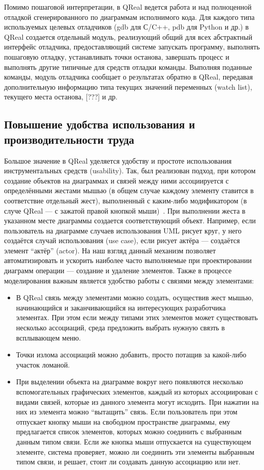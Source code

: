 \documentclass[a4paper]{article}
\begin{document}
Помимо пошаговой интерпретации, в QReal ведется работа и над полноценной отладкой сгенерированного по диаграммам исполнимого кода. Для каждого типа используемых целевых отладчиков (gdb для С/C++, pdb для Python и др.) в QReal создается отдельный модуль, реализующий общий для всех абстрактный интерфейс отладчика, предоставляющий системе запускать программу, выполнять пошаговую отладку, устанавливать точки останова, завершать процесс и выполнять другие типичные для средств отладки команды. Выполняя поданные команды, модуль отладчика сообщает о результатах обратно в QReal, передавая дополнительную информацию типа текущих значений переменных (watch list), текущего места останова, [???] и др. 
  
\subsection{Повышение удобства использования и производительности труда}

Большое значение в QReal уделяется удобству и простоте использования инструментальных средств (usability). Так, был реализован подход, при котором создание объектов на диаграммах и связей между ними ассоциируется с определёнными жестами мышью (в общем случае каждому элементу ставится в соответствие отдельный жест), выполненный с каким-либо модификатором (в случе QReal --- с зажатой правой кнопкой мыши)~\cite{mousegestures}. При выполнении жеста в указанном месте диаграммы создается соответствующий объект. Например, если пользователь на диаграмме случаев использования UML рисует круг, у него создаётся случай использования (use case), если рисует актёра --- создаётся элемент ``актёр'' (actor). На наш взгляд данный механизм позволяет автоматизировать и ускорить наиболее часто выполняемые при проектировании диаграмм операции --- создание и удаление элементов. Также в процессе моделирования важным является удобство работы с связями между элементами:
\begin{itemize} 
  \item В QReal связь между элементами можно создать, осуществив жест мышью, начинающийся и заканчивающийся на интересующих разработчика элементах. При этом если между типами этих элементов может существовать несколько ассоциаций, среда предложить выбрать нужную связть в всплывающем меню. 
  \item Точки излома ассоциаций можно добавить, просто потащив за какой-либо участок ломаной. 
  \item При выделении объекта на диаграмме вокруг него появляются несколько вспомогательных графических элементов, каждый из которых ассоциирован с видами связей, которые из данного элемента могут исходить. При нажатии на них из элемента можно “вытащить” связь. Если пользователь при этом отпускает кнопку мыши на свободном пространстве диаграммы, ему предлагается список элементов, которых можно соединить с выбранным данным типом связи. Если же кнопка мыши отпускается на существующем элементе, система проверяет, можно ли соединить эти элементы выбранным типом связи, и решает, стоит ли создавать данную ассоциацию или нет. 
\end{itemize}
\end{document}

